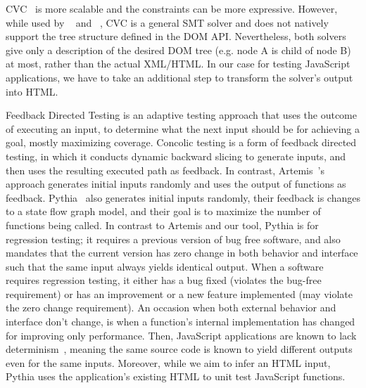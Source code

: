 CVC~\cite{cvc3, cvc4} is more scalable and the constraints can be more expressive.  
However, while used by ~\cite{cute} and ~\cite{jalangi}, CVC is a general SMT solver and does not natively support the tree structure defined in the DOM API.  
Nevertheless, both solvers give only a description of the desired DOM tree (e.g. node A is child of node B) at most, rather than the actual XML/HTML. 
In our case for testing JavaScript applications, we have to take an additional step to transform the solver’s output into HTML.


Feedback Directed Testing is an adaptive testing approach that uses the outcome of executing an input, to determine what the next input should be for achieving a goal, mostly maximizing coverage. 
Concolic testing is a form of feedback directed testing, in which it conducts dynamic backward slicing to generate inputs, and then uses the resulting executed path as feedback.  
In contrast, Artemis~\cite{artemis}’s approach generates initial inputs randomly and uses the output of functions as feedback.  
Pythia~\cite{pythia} also generates initial inputs randomly, their feedback is changes to a state flow graph model, and their goal is to maximize the number of functions being called. 
In contrast to Artemis and our tool, Pythia is for regression testing; it requires a previous version of bug free software, and also mandates that the current version has zero change in both behavior and interface such that the same input always yields identical output. 
When a software requires regression testing, it either has a bug fixed (violates the bug-free requirement) or has an improvement or a new feature implemented (may violate the zero change requirement).  
An occasion when both external behavior and interface don’t change, is when a function’s internal implementation has changed for improving only performance. 
Then, JavaScript applications are known to lack determinism~\cite{mugshot}, meaning the same source code is known to yield different outputs even for the same inputs.  
Moreover, while we aim to infer an HTML input, Pythia uses the application’s existing HTML to unit test JavaScript functions.

